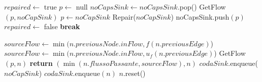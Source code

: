 \documentclass{article}
\begin{document}
\newpage

\begin{algorithm}
    \begin{algorithmic}[1]
        \STATE $repaired \leftarrow$ true
        \STATE $p \leftarrow $ null
        \STATE $noCapsSink \leftarrow noCapsSink.$pop()
        \STATE GetFlow$(p,noCapSink)$
        \STATE $p \leftarrow noCapSink$
        \STATE Repair($noCapSink$)
        \STATE noCapsSink.push$(p)$
        \STATE $repaired \leftarrow$ false
        \STATE \textbf{break}
        \ENDIF
        \ENDWHILE

         
        \STATE $sourceFlow \leftarrow \min(n.previousNode.inFlow,f(n.previousEdge)$)
        \ELSE
        \STATE $sourceFlow \leftarrow \min(n.previousNode.inFlow,u_f(n.previousEdge) $)
        \ENDIF
        \STATE GetFlow$(p,n)$
        \STATE \textbf{return} $(\min(n.flussoPassante,sourceFlow),n)$
        \ENDIF
        \ENDFOR
        \ENDIF
        \STATE $codaSink.$enqueue($noCapSink$)
        \ELSE
        \STATE $codaSink.$enqueue$(n)$
        \ENDFOR
        \STATE $n.$reset()
        \ENDFOR
        \ENDIF
        \ENDIF
        \ENDIF

    \end{algorithmic}
\end{algorithm}
\end{document}
